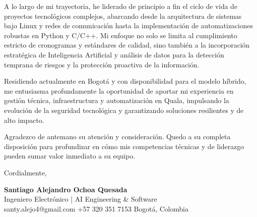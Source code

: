 \documentclass[11pt,a4paper]{article}
\begin{document}
A lo largo de mi trayectoria, he liderado de principio a fin el ciclo de vida de proyectos tecnológicos complejos, abarcando desde la arquitectura de sistemas bajo Linux y redes de comunicación hasta la implementación de automatizaciones robustas en Python y C/C++. Mi enfoque no solo se limita al cumplimiento estricto de cronogramas y estándares de calidad, sino también a la incorporación estratégica de Inteligencia Artificial y análisis de datos para la detección temprana de riesgos y la protección proactiva de la información.

Residiendo actualmente en Bogotá y con disponibilidad para el modelo híbrido, me entusiasma profundamente la oportunidad de aportar mi experiencia en gestión técnica, infraestructura y automatización en Quala, impulsando la evolución de la seguridad tecnológica y garantizando soluciones resilientes y de alto impacto.

Agradezco de antemano su atención y consideración. Quedo a su completa disposición para profundizar en cómo mis competencias técnicas y de liderazgo pueden sumar valor inmediato a su equipo.

\vspace{10pt}
\noindent Cordialmente,

\vspace{12pt}
\noindent
\textbf{\large\color{accent} Santiago Alejandro Ochoa Quesada}\\
{\small\color{subtletext} Ingeniero Electrónico | AI Engineering \& Software}\\
{\footnotesize\color{subtletext} santy.alejo4@gmail.com \;\textbar\; +57 320 351 7153 \;\textbar\; Bogotá, Colombia}
\end{document}
